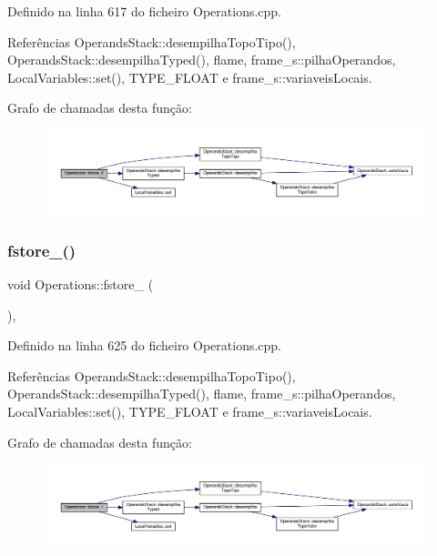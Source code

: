 Definido na linha 617 do ficheiro Operations.\+cpp.



Referências Operands\+Stack\+::desempilha\+Topo\+Tipo(), Operands\+Stack\+::desempilha\+Typed(), flame, frame\+\_\+s\+::pilha\+Operandos, Local\+Variables\+::set(), T\+Y\+P\+E\+\_\+\+F\+L\+O\+AT e frame\+\_\+s\+::variaveis\+Locais.

Grafo de chamadas desta função\+:
\nopagebreak
\begin{figure}[H]
\begin{center}
\leavevmode
\includegraphics[width=350pt]{classOperations_a7465534bbf4e4ca9f0493a8dbe645d46_cgraph}
\end{center}
\end{figure}
\mbox{\label{classOperations_a2ea876acd29db9eec798302229bfd5e5}} 
\subsubsection{\texorpdfstring{fstore\+\_()}{fstore\_1()}}
{\footnotesize\ttfamily void Operations\+::fstore\+\_ (\begin{DoxyParamCaption}{ }\end{DoxyParamCaption})\hspace{0.3cm}{\ttfamily [static]}, {\ttfamily [private]}}



Definido na linha 625 do ficheiro Operations.\+cpp.



Referências Operands\+Stack\+::desempilha\+Topo\+Tipo(), Operands\+Stack\+::desempilha\+Typed(), flame, frame\+\_\+s\+::pilha\+Operandos, Local\+Variables\+::set(), T\+Y\+P\+E\+\_\+\+F\+L\+O\+AT e frame\+\_\+s\+::variaveis\+Locais.

Grafo de chamadas desta função\+:
\nopagebreak
\begin{figure}[H]
\begin{center}
\leavevmode
\includegraphics[width=350pt]{classOperations_a2ea876acd29db9eec798302229bfd5e5_cgraph}
\end{center}
\end{figure}
\mbox{\label{classOperations_a6d0a2faa9f164d49accf491a95364e2f}} 

